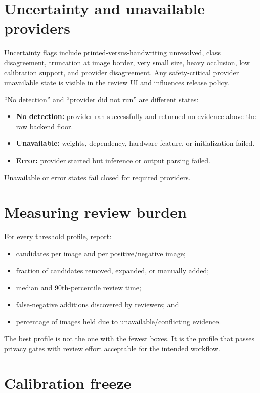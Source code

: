 \section{Uncertainty and unavailable providers}

Uncertainty flags include printed-versus-handwriting unresolved, class disagreement, truncation at image border, very small size, heavy occlusion, low calibration support, and provider disagreement. Any safety-critical provider unavailable state is visible in the review UI and influences release policy.

``No detection'' and ``provider did not run'' are different states:

\begin{itemize}[leftmargin=6mm]
  \item \textbf{No detection:} provider ran successfully and returned no evidence above the raw backend floor.
  \item \textbf{Unavailable:} weights, dependency, hardware feature, or initialization failed.
  \item \textbf{Error:} provider started but inference or output parsing failed.
\end{itemize}

Unavailable or error states fail closed for required providers.

\section{Measuring review burden}

For every threshold profile, report:

\begin{itemize}[leftmargin=6mm]
  \item candidates per image and per positive/negative image;
  \item fraction of candidates removed, expanded, or manually added;
  \item median and 90th-percentile review time;
  \item false-negative additions discovered by reviewers; and
  \item percentage of images held due to unavailable/conflicting evidence.
\end{itemize}

The best profile is not the one with the fewest boxes. It is the profile that passes privacy gates with review effort acceptable for the intended workflow.

\section{Calibration freeze}


